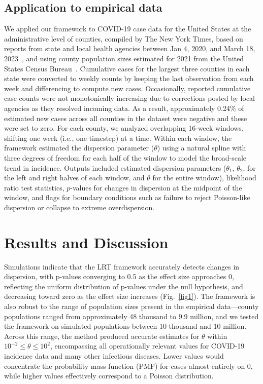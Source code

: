 \documentclass[11pt,letterpaper]{article}
\begin{document}
\begin{Abstract}
\subsection*{Application to empirical data}
We applied our framework to COVID-19 case data for the United States at the administrative level of counties, compiled by The New York Times, based on reports from state and local health agencies between Jan 4, 2020, and March 18, 2023~\citep{nytimes_covid19_2021}, and using county population sizes estimated for 2021 from the United States Census Bureau~\citep{us_census_county_estimates_2021}.
Cumulative cases for the largest three counties in each state were converted to weekly counts by keeping the last observation from each week and differencing to compute new cases. Occasionally, reported cumulative case counts were not monotonically increasing due to corrections posted by local agencies as they resolved incoming data. 
As a result, approximately 0.24\% of estimated new cases across all counties in the dataset were negative and these were set to zero. 
For each county, we analyzed overlapping 16-week windows, shifting one week (i.e., one timestep) at a time. 
Within each window, the framework estimated the dispersion parameter ($\theta$) using a natural spline with three degrees of freedom for each half of the window to model the broad-scale trend in incidence. 
Outputs included estimated dispersion parameters ($\theta_1$, $\theta_2$, for the left and right halves of each window, and $\theta$ for the entire window), likelihood ratio test statistics, $p$-values for changes in dispersion at the midpoint of the window, and flags for boundary conditions such as failure to reject Poisson-like dispersion or collapse to extreme overdispersion.

\section*{Results and Discussion}

Simulations indicate that the LRT framework accurately detects changes in dispersion, with p-values converging to 0.5 as the effect size approaches 0, reflecting the uniform distribution of p-values under the null hypothesis, and decreasing toward zero as the effect size increases (Fig.~\ref{fig1}). The framework is also robust to the range of population sizes present in the empirical data—county populations ranged from approximately 48 thousand to 9.9 million, and we tested the framework on simulated populations between 10 thousand and 10 million. Across this range, the method produced accurate estimates for $\theta$ within $10^{-2} \leq \theta \leq 10^2$, encompassing all operationally relevant values for COVID-19 incidence data and many other infectious diseases. Lower values would concentrate the probability mass function (PMF) for cases almost entirely on 0, while higher values effectively correspond to a Poisson distribution.


\end{Abstract}
\end{document}

